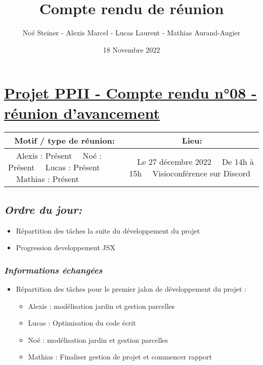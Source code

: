 \documentclass[french,a4paper]{article}
\author{Noé Steiner - Alexis Marcel - Lucas Laurent - Mathias Aurand-Augier}
\date{18 Novembre 2022}
\newcommand{\tabitem}{\textbullet~~}\title{Compte rendu de réunion}
\begin{document}
\maketitle

\section*{\underline{Projet PPII - Compte rendu n°08 - réunion d'avancement}}

\begin{table}[!htb]
  \centering
  \begin{tabular}{| p{7cm} | p{7cm} |}
    \hline
    \multicolumn{1}{|c|}{ Motif / type de réunion:} & \multicolumn{1}{c|}{Lieu:} \\
    \hline
    \tabitem Alexis : Présent\newline
    \tabitem Noé : Présent\newline
    \tabitem Lucas : Présent\newline
    \tabitem Mathias : Présent                      &
    \tabitem Le 27 décembre 2022\newline
    \tabitem De 14h à 15h\newline
    \tabitem Visioconférence sur Discord                                         \\
    \hline
  \end{tabular}
\end{table}

\subsection*{\textit{Ordre du jour:}}

\begin{itemize}
  \item Répartition des tâches la suite du développement du projet
  \item Progression developpement JSX
\end{itemize}

\subsubsection*{\textit{Informations échangées}}
\begin{itemize}
  \item Répartition des tâches pour le premier jalon de développement du projet :
    \begin{itemize}
      \item Alexis : modélisation jardin et gestion parcelles
      \item Lucas : Optimisation du code écrit
      \item Noé : modélisation jardin et gestion parcelles
      \item Mathias : Finaliser gestion de projet et commencer rapport
    \end{itemize}
\end{itemize}
\end{document}
